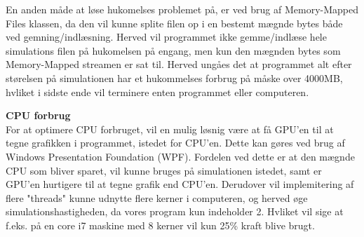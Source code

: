 En anden måde at løse hukomelses problemet på, er ved brug af Memory-Mapped Files klassen, da den vil kunne splite filen op i en bestemt mægnde bytes  både ved gemning/indlæsning. Herved vil programmet ikke gemme/indlæse hele simulations filen på hukomelsen på engang, men kun den mægnden bytes som Memory-Mapped streamen er sat til. Herved ungåes det at programmet alt efter størelsen på simulationen har et hukommelses forbrug på måske over 4000MB, hvliket i sidste ende vil terminere enten programmet eller computeren.

\vspace{5mm}

\textbf{CPU forbrug} \\
For at optimere CPU forbruget, vil en mulig løsnig være at få GPU'en til at tegne grafikken i programmet, istedet for CPU'en. Dette kan gøres ved brug af Windows Presentation Foundation (WPF). Fordelen ved dette er at den mægnde CPU som bliver sparet,  vil kunne bruges på simulationen istedet, samt er GPU'en hurtigere til at tegne grafik end CPU'en. Derudover vil implemitering af flere "threads" kunne udnytte flere kerner i computeren, og herved øge simulationshastigheden, da vores program kun indeholder 2. Hvliket vil sige at f.eks. på en core i7 maskine med 8 kerner vil kun 25\% kraft blive brugt.






